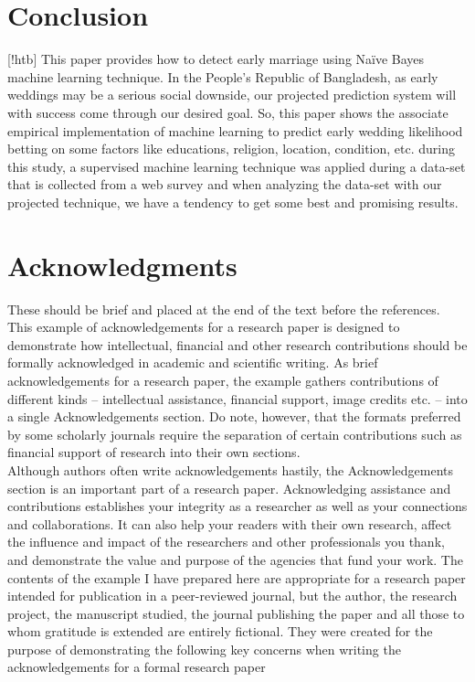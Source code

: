 \documentclass{article}
\begin{document}
\pagebreak\section{Conclusion}[!htb]
    This paper provides how to detect early marriage using Naïve Bayes machine learning technique. In the People's Republic of Bangladesh, as early weddings may be a serious social downside, our projected prediction system will with success come through our desired goal. So, this paper shows the associate empirical implementation of machine learning to predict early wedding likelihood betting on some factors like educations, religion, location, condition, etc. during this study, a supervised machine learning technique was applied during a data-set that is collected from a web survey and when analyzing the data-set with our projected technique, we have a tendency to get some best and promising results.
\section{Acknowledgments }
    These should be brief and placed at the end of the text before the references. This example of acknowledgements for a research paper is designed to demonstrate how intellectual, financial and other research contributions should be formally acknowledged in academic and scientific writing. As brief acknowledgements for a research paper, the example gathers contributions of different kinds – intellectual assistance, financial support, image credits etc. – into a single Acknowledgements section. Do note, however, that the formats preferred by some scholarly journals require the separation of certain contributions such as financial support of research into their own sections. \\
    Although authors often write acknowledgements hastily, the Acknowledgements section is an important part of a research paper. Acknowledging assistance and contributions establishes your integrity as a researcher as well as your connections and collaborations. It can also help your readers with their own research, affect the influence and impact of the researchers and other professionals you thank, and demonstrate the value and purpose of the agencies that fund your work. The contents of the example I have prepared here are appropriate for a research paper intended for publication in a peer-reviewed journal, but the author, the research project, the manuscript studied, the journal publishing the paper and all those to whom gratitude is extended are entirely fictional. They were created for the purpose of demonstrating the following key concerns when writing the acknowledgements for a formal research paper 
\end{document}
